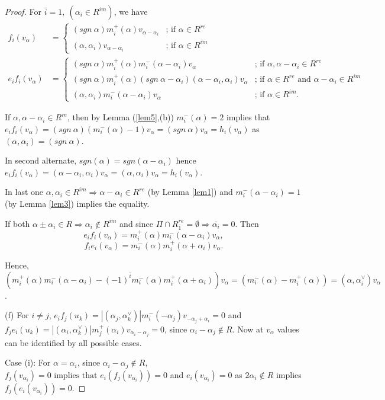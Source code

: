 \documentclass[11pt]{amsart}
\theoremstyle{plain}
\theoremstyle{definition}
\numberwithin{equation}{section}
\newcommand{\al}{\alpha}
\begin{document}
\begin{proof}
		For $\bar{i}=1,~(\al_i\in R^{im})$, we have
		\begin{align*}
			f_i(v_{\alpha})&=\begin{cases}
				(sgn~\al)m_i^+(\alpha)v_{\alpha-\al_i}& \text{; if }\al\in R^{re}\\(\al,\al_i)v_{\al-\al_i}&\text{; if }\al\in R^{im}
			\end{cases}\\
			e_if_i(v_{\alpha})&=\begin{cases}
				(sgn~\al)m_i^+(\alpha)m_i^-(\al-\al_i)v_{\alpha}& \text{; if }\al,\al-\al_i\in R^{re}\\
				(sgn~\al)m_i^+(\al)(sgn~\al-\al_i)(\al-\al_i,\al_i)v_{\al}&\text{; if }\al\in R^{re}\text{ and }\al-\al_i\in R^{im}\\
				(\al,\al_i)m_i^-(\al-\al_i)v_{\al}&\text{; if }\al\in R^{im}.
			\end{cases}
		\end{align*}
		
		If $\al,\al-\al_i\in R^{re}$, then by Lemma (\ref{lem5},(b)) $m_i^-(\al)=2$ implies that $e_if_i(v_{\al})=(sgn~\al)(m_i^-(\al)-1)v_{\al}=(sgn~\al)v_{\al}=h_i(v_{\al})$ as $(\al,\al_i)=(sgn~\al)$.
		
		In second alternate, $sgn(\al)=sgn(\al-\al_i)$ hence $e_if_i(v_{\al})=(\al-\al_i,\al_i)v_{\al}=(\al,\al_i)v_{\al}=h_i(v_{\al})$.
		
		In last one $\al,\al_i\in R^{im}\Rightarrow\al-\al_i\in R^{re}$ (by Lemma \ref{lem1}) and $m_i^-(\al-\al_i)=1$ (by Lemma \ref{lem3}) implies the equality.
		
		If both $\al\pm\al_i\in R\Rightarrow\al_i\notin R^{im}$ and since $\Pi\cap R_{\bar 1}^{re}=\emptyset\Rightarrow\bar{\al_i}=0$. Then 
		$$e_if_i(v_{\al})=m_i^+(\al)m_i^-(\al-\al_i)v_{\al},$$ $$f_ie_i(v_{\al})=m_i^-(\al)m_i^+(\al+\al_i)v_{\al}.$$ 
		
		Hence, $(m_i^+(\al)m_i^-(\al-\al_i)-(-1)^{\bar i}m_i^-(\al)m_i^+(\al+\al_i))v_{\al}=(m_i^-(\al)-m_i^+(\al))=(\al,\al_i^{\vee})v_{\al}$.
		
		\noindent
		(f) For $i\neq j$,
		$e_if_j(u_k)=|( \alpha_j,\alpha_k^{\vee})|m_i^-(-\al_j)v_{-\alpha_j+\alpha_i}=0$ and $f_je_i(u_k)=|( \alpha_i,\alpha_k^{\vee})|m_j^+(\al_i)v_{\alpha_i-\alpha_j}=0$, since $\alpha_i-\alpha_j\notin R$. Now at $v_{\alpha}$ values can be identified by all possible cases.
		
		Case (i): For $\alpha=\alpha_i$, since $\alpha_i-\alpha_j\notin R$, $f_j(v_{\alpha_i})=0\text{ implies that } e_i(f_j(v_{\alpha_i}))=0$ and $e_i(v_{\alpha_i})=0$ as $2\al_i\notin R$ implies $f_j(e_i(v_{\alpha_i}))=0$.
		

\end{proof}
\end{document}
